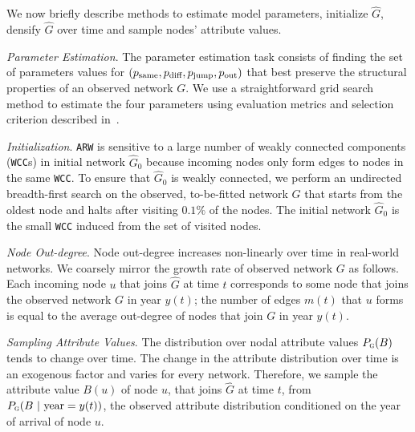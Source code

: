 We now briefly describe methods to estimate model parameters,
initialize $\hat{G}$, densify $\hat{G}$ over time and sample nodes' attribute values.

\textit{Parameter Estimation}.
The parameter estimation task consists of finding the set of parameters values
for $(p_{\scriptsize\mbox{same}}, p_{\scriptsize\mbox{diff}}, p_{\scriptsize\mbox{jump}}, p_{\scriptsize\mbox{out}})$ that best preserve the structural properties of an
observed network $G$. We use a straightforward grid search method to estimate
the four parameters using evaluation metrics and selection criterion described in~.

\textit{Initialization}. \texttt{ARW} is
sensitive to a large number of weakly connected components (\texttt{WCC}s) in
initial network $\hat{G}_0$ because incoming nodes only form edges to nodes
in the same \texttt{WCC}. To ensure that $\hat{G}_0$ is weakly
connected, we perform an undirected breadth-first search on the observed,
to-be-fitted network $G$ that starts from the oldest node and halts after
visiting $0.1\%$ of the nodes. The initial network $\hat{G}_0$ is the small \texttt{WCC}
induced from the set of visited nodes.


\textit{Node Out-degree}.
Node out-degree increases non-linearly over time in real-world networks.
We coarsely mirror the growth rate of observed network $G$ as follows.
Each incoming node $u$ that joins $\hat{G}$ at time $t$ corresponds to some
node that joins the observed network $G$ in year $y(t)$; the number of edges $m(t)$
that $u$ forms is equal to the average out-degree of nodes that join $G$ in year $y(t)$.

\textit{Sampling Attribute Values}.
The distribution over nodal attribute values $P_{\textsc{g}}(B)$ tends to change over time.
The change in the attribute distribution over time is an exogenous factor and varies for every network.
Therefore, we sample the attribute value $B(u)$ of node $u$, that joins $\hat{G}$ at time
$t$, from $P_{\textsc{g}}(B{\mbox{ | year}=y(t)})$, the observed attribute
distribution conditioned on the year of arrival of node $u$.


